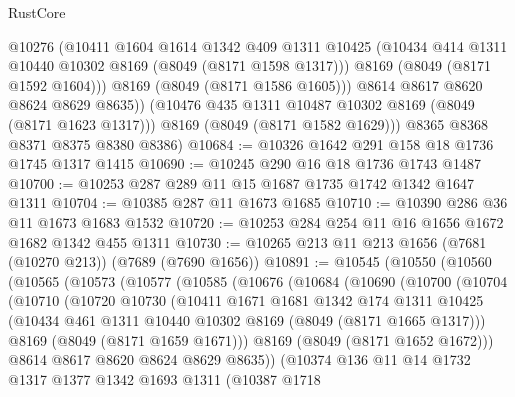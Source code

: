 \begin{lexlean}{RustCore}
\begin{coremodule}
              @10276
              (@10411
                @1604
                @1614
                @1342
                @409
                @1311
                @10425
                (@10434 @414 @1311 @10440 @10302 @8169 (@8049 (@8171 @1598 @1317)))
                @8169
                (@8049 (@8171 @1592 @1604)))
              @8169
              (@8049 (@8171 @1586 @1605)))
            @8614
            @8617
            @8620
            @8624
            @8629
            @8635))
        (@10476 @435 @1311 @10487 @10302 @8169 (@8049 (@8171 @1623 @1317)))
        @8169
        (@8049 (@8171 @1582 @1629)))
      @8365
      @8368
      @8371
      @8375
      @8380
      @8386)
@10684 := @10326 @1642 @291 @158 @18 @1736 @1745 @1317 @1415
@10690 := @10245 @290 @16 @18 @1736 @1743 @1487
@10700 := @10253 @287 @289 @11 @15 @1687 @1735 @1742 @1342 @1647 @1311
@10704 := @10385 @287 @11 @1673 @1685
@10710 := @10390 @286 @36 @11 @1673 @1683 @1532
@10720 := @10253 @284 @254 @11 @16 @1656 @1672 @1682 @1342 @455 @1311
@10730 := @10265 @213 @11 @213 @1656 (@7681 (@10270 @213)) (@7689 (@7690 @1656))
@10891 := @10545
    (@10550
      (@10560
        (@10565
          (@10573
            (@10577
              (@10585
                (@10676
                  (@10684
                    (@10690
                      (@10700
                        (@10704
                          (@10710
                            (@10720
                              @10730
                              (@10411
                                @1671
                                @1681
                                @1342
                                @174
                                @1311
                                @10425
                                (@10434 @461 @1311 @10440 @10302 @8169 (@8049 (@8171 @1665 @1317)))
                                @8169
                                (@8049 (@8171 @1659 @1671)))
                              @8169
                              (@8049 (@8171 @1652 @1672)))
                            @8614
                            @8617
                            @8620
                            @8624
                            @8629
                            @8635))
                        (@10374
                          @136
                          @11
                          @14
                          @1732
                          @1317
                          @1377
                          @1342
                          @1693
                          @1311
                          (@10387
                            @1718

\end{coremodule}
\end{lexlean}
